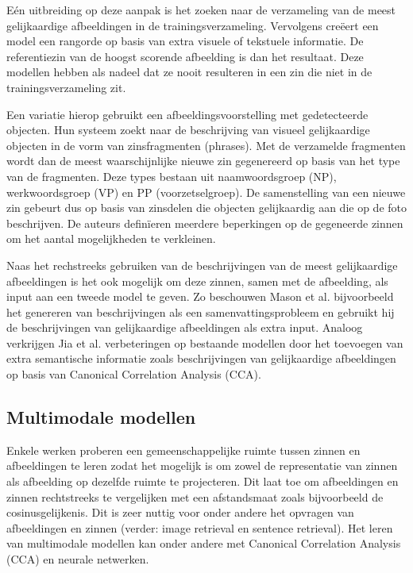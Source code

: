 E\'en uitbreiding op deze aanpak is het zoeken naar de verzameling van de meest gelijkaardige afbeeldingen in de trainingsverzameling. Vervolgens cre\"eert een model een rangorde op basis van extra visuele of tekstuele informatie. De referentiezin van de hoogst scorende afbeelding is dan het resultaat\cite{Devlin2015a,Hodosh2013,Oliva2006,Ordonez2011}. 
Deze modellen hebben als nadeel dat ze nooit resulteren in een zin die niet in de trainingsverzameling zit.

Een variatie\cite{Gupta2012,Kuznetsova2012} hierop gebruikt een afbeeldingsvoorstelling met gedetecteerde objecten. Hun systeem zoekt naar de beschrijving van visueel gelijkaardige objecten in de vorm van zinsfragmenten (phrases). Met de verzamelde fragmenten wordt dan de meest waarschijnlijke nieuwe zin gegenereerd op basis van het type van de fragmenten. Deze types bestaan uit naamwoordsgroep (NP), werkwoordsgroep (VP) en PP (voorzetselgroep). De samenstelling van een nieuwe zin gebeurt dus op basis van zinsdelen die objecten gelijkaardig aan die op de foto beschrijven. De auteurs defin\"ieren meerdere beperkingen op de gegeneerde zinnen om het aantal mogelijkheden te verkleinen.

Naas het rechstreeks gebruiken van de beschrijvingen van de meest gelijkaardige afbeeldingen is het ook mogelijk om deze zinnen, samen met de afbeelding, als input aan een tweede model te geven. Zo beschouwen Mason et al.\cite{Mason2014} bijvoorbeeld het genereren van beschrijvingen als een samenvattingsprobleem en gebruikt hij de beschrijvingen van gelijkaardige afbeeldingen als extra input. Analoog verkrijgen Jia et al.\cite{Fernando2015} verbeteringen op bestaande modellen door het toevoegen van extra semantische informatie zoals beschrijvingen van gelijkaardige afbeeldingen op basis van Canonical Correlation Analysis (CCA).
 
\subsection{Multimodale modellen}
Enkele werken proberen een gemeenschappelijke ruimte tussen zinnen en afbeeldingen te leren zodat het mogelijk is om zowel de representatie van zinnen als afbeelding op dezelfde ruimte te projecteren. Dit laat toe om afbeeldingen en zinnen rechtstreeks te vergelijken met een afstandsmaat zoals bijvoorbeeld de cosinusgelijkenis. Dit is zeer nuttig voor onder andere het opvragen van afbeeldingen en zinnen (verder: image retrieval en sentence retrieval). Het leren van multimodale modellen kan onder andere met Canonical Correlation Analysis (CCA)\cite{Hodosh2013} en neurale netwerken\cite{Mao2014,Karpathy2014,Kiros2013}. 

